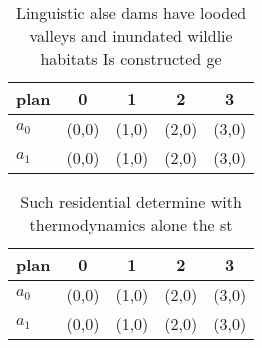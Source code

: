 \documentclass[a4paper]{article}
\begin{document}
\begin{table}
\begin{adjustbox}{width=0.6\columnwidth}
\begin{tabular}{|l|l|l|l|l|}
\hline
\textbf{plan} & \multicolumn{1}{c|}{\textbf{0}} & \multicolumn{1}{c|}{\textbf{1}} & \multicolumn{1}{c|}{\textbf{2}} & \multicolumn{1}{c|}{\textbf{3}} \\ \hline
\textbf{$a_0$}  & (0,0) & (1,0) & (2,0) & (3,0) \\ \hline
\textbf{$a_1$}  & (0,0) & (1,0) & (2,0) & (3,0) \\ \hline
\end{tabular}
\end{adjustbox}
\caption{Linguistic alse dams have looded valleys and inundated wildlie habitats Is constructed ge
}
\end{table}

\begin{table}
\begin{adjustbox}{width=0.6\columnwidth}
\begin{tabular}{|l|l|l|l|l|}
\hline
\textbf{plan} & \multicolumn{1}{c|}{\textbf{0}} & \multicolumn{1}{c|}{\textbf{1}} & \multicolumn{1}{c|}{\textbf{2}} & \multicolumn{1}{c|}{\textbf{3}} \\ \hline
\textbf{$a_0$}  & (0,0) & (1,0) & (2,0) & (3,0) \\ \hline
\textbf{$a_1$}  & (0,0) & (1,0) & (2,0) & (3,0) \\ \hline
\end{tabular}
\end{adjustbox}
\caption{Such residential determine with thermodynamics alone the st
}
\end{table}
\end{document}
